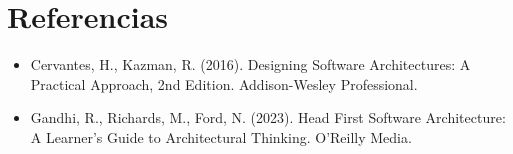 \section{Referencias}

\begin{itemize}
    \item Cervantes, H., Kazman, R. (2016). Designing Software Architectures: A Practical Approach, 2nd Edition. Addison-Wesley Professional.
    \item Gandhi, R., Richards, M., Ford, N. (2023). Head First Software Architecture: A Learner's Guide to Architectural Thinking. O'Reilly Media.
\end{itemize}

